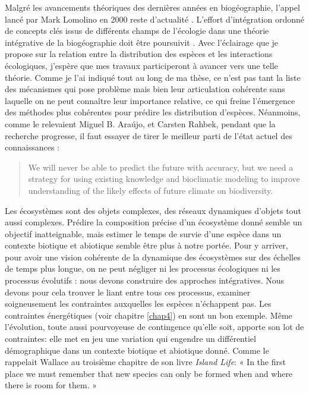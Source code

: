 Malgré les avancements théoriques des dernières années en biogéographie,
l'appel lancé par Mark Lomolino en 2000 reste d'actualité
\citep{Lomolino2000}. L'effort d'intégration ordonné de concepts clés
issus de différents champs de l'écologie dans une théorie intégrative de
la biogéographie doit être poursuivit \citep{Thuiller2013}. Avec
l'éclairage que je propose sur la relation entre la distribution des
espèces et les interactions écologiques, j'espère que mes travaux
participeront à avancer vers une telle théorie. Comme je l'ai indiqué
tout au long de ma thèse, ce n'est pas tant la liste des mécanismes qui
pose problème mais bien leur articulation cohérente sans laquelle on ne
peut connaître leur importance relative, ce qui freine l'émergence des
méthodes plus cohérentes pour prédire les distribution d'espèces.
Néanmoins, comme le relevaient Miguel B. Araújo, et Carsten Rahbek,
pendant que la recherche progresse, il faut essayer de tirer le meilleur
parti de l'état actuel des connaissances \citep{Araujo2006} :

\begin{quote}
We will never be able to predict the future with accuracy, but we need a
strategy for using existing knowledge and bioclimatic modeling to
improve understanding of the likely effects of future climate on
biodiversity.
\end{quote}

Les écosystèmes sont des objets complexes, des réseaux dynamiques
d'objets tout aussi complexes. Prédire la composition précise d'un
écosystème donné semble un objectif inatteignable, mais estimer le temps
de survie d'une espèce dans un contexte biotique et abiotique semble
être plus à notre portée. Pour y arriver, pour avoir une vision
cohérente de la dynamique des écosystèmes sur des échelles de temps plus
longue, on ne peut négliger ni les processus écologiques ni les
processus évolutifs : nous devons construire des approches intégratives.
Nous devons pour cela trouver le liant entre tous ces processus,
examiner soigneusement les contraintes auxquelles les espèces
n'échappent pas. Les contraintes énergétiques (voir chapitre
\ref{chap4}) en sont un bon exemple. Même l'évolution, toute aussi
pourvoyeuse de contingence qu'elle soit, apporte son lot de contraintes:
elle met en jeu une variation qui engendre un différentiel démographique
dans un contexte biotique et abiotique donné. Comme le rappelait Wallace
au troisième chapitre de son livre \emph{Island Life}: « In the first
place we must remember that new species can only be formed when and
where there is room for them. »
